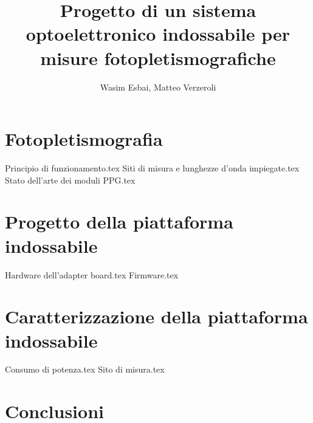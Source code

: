 \documentclass[12pt,a4paper]{book}
\title{Progetto di un sistema optoelettronico indossabile per misure fotopletismografiche}
\author{Wasim Esbai, Matteo Verzeroli}
\begin{document}
	\maketitle
	
	\tableofcontents
	
	\chapter{Fotopletismografia}
	{Principio di funzionamento.tex}
	{Siti di misura e lunghezze d’onda impiegate.tex}
	{Stato dell’arte dei moduli PPG.tex}
	
	\chapter{Progetto della piattaforma indossabile}
	{Hardware dell’adapter board.tex}
	{Firmware.tex}
	
	\chapter{Caratterizzazione della piattaforma indossabile}
	{Consumo di potenza.tex}
	{Sito di misura.tex}
	
	\chapter{Conclusioni}
	
	
\end{document}
